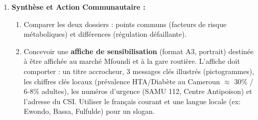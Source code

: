 \documentclass[11pt]{article}
\begin{document}
\begin{enumerate}
\begin{enumerate}
        \item Interpréter la créatininémie et la protéinurie : quelle atteinte d'organe « cible » est suspectée ?
    \end{enumerate}
    \item \textbf{Synthèse et Action Communautaire :}
    \begin{enumerate}
        \item Comparer les deux dossiers : points communs (facteurs de risque métaboliques) et différences (régulation défaillante).
        \item Concevoir une \textbf{affiche de sensibilisation} (format A3, portrait) destinée à être affichée au marché Mfoundi et à la gare routière. L'affiche doit comporter : un titre accrocheur, 3 messages clés illustrés (pictogrammes), les chiffres clés locaux (prévalence HTA/Diabète au Cameroun $\approx$ 30\% / 6-8\% adultes), les numéros d'urgence (SAMU 112, Centre Antipoison) et l'adresse du CSI. Utiliser le français courant et une langue locale (ex: Ewondo, Bassa, Fulfulde) pour un slogan.
    \end{enumerate}
\end{enumerate}
\end{document}
